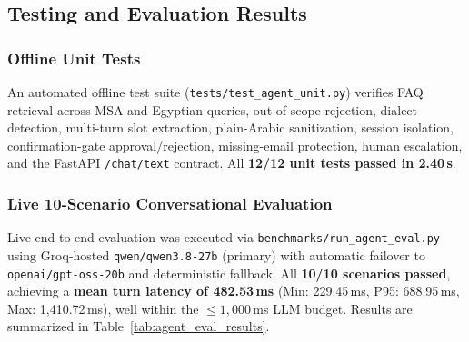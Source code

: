 \subsection{Testing and Evaluation Results}
\label{subsec:agent_testing}

\subsubsection{Offline Unit Tests}
An automated offline test suite (\texttt{tests/test\_agent\_unit.py}) verifies FAQ retrieval across MSA and Egyptian queries, out-of-scope rejection, dialect detection, multi-turn slot extraction, plain-Arabic sanitization, session isolation, confirmation-gate approval/rejection, missing-email protection, human escalation, and the FastAPI \texttt{/chat/text} contract. All \textbf{12/12 unit tests passed in 2.40\,s}.

\subsubsection{Live 10-Scenario Conversational Evaluation}
Live end-to-end evaluation was executed via \texttt{benchmarks/run\_agent\_eval.py} using Groq-hosted \texttt{qwen/qwen3.8-27b} (primary) with automatic failover to \texttt{openai/gpt-oss-20b} and deterministic fallback. All \textbf{10/10 scenarios passed}, achieving a \textbf{mean turn latency of 482.53\,ms} (Min: 229.45\,ms, P95: 688.95\,ms, Max: 1,410.72\,ms), well within the $\le 1,000$\,ms LLM budget. Results are summarized in Table~\ref{tab:agent_eval_results}.


